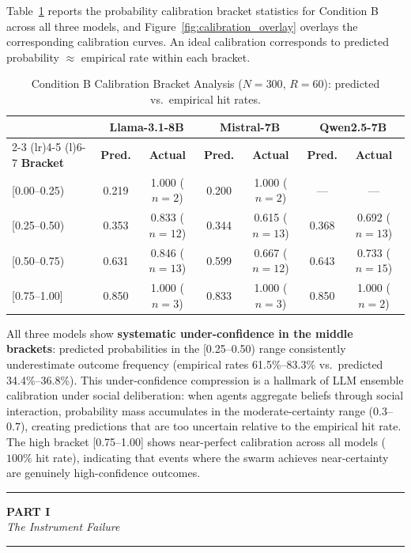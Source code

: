 \documentclass[11pt,journal,onecolumn]{IEEEtran}
\newcommand{\parttitle}[2]{%
  \par\addvspace{1.6\baselineskip}%
  \noindent\rule{\textwidth}{0.9pt}\par\vspace{0.45em}%
  \begin{center}
    {\large\bfseries PART #1}\\[0.3em]
    {\large\itshape #2}
  \end{center}%
  \vspace{0.25em}\noindent\rule{\textwidth}{0.9pt}%
  \par\addvspace{1.1\baselineskip}%
  \nopagebreak}
\begin{document}
Table~\ref{tab:calibration_quality} reports the probability calibration bracket statistics for Condition B across all three models, and Figure~\ref{fig:calibration_overlay} overlays the corresponding calibration curves. An ideal calibration corresponds to predicted probability $\approx$ empirical rate within each bracket.

\begin{table}[!htbp]
\centering
\caption{Condition B Calibration Bracket Analysis ($N=300$, $R=60$): predicted vs.\ empirical hit rates.}
\label{tab:calibration_quality}
\small
\begin{tabular}{lcccccc}
\toprule
 & \multicolumn{2}{c}{\textbf{Llama-3.1-8B}} & \multicolumn{2}{c}{\textbf{Mistral-7B}} & \multicolumn{2}{c}{\textbf{Qwen2.5-7B}} \\
\cmidrule(r){2-3} \cmidrule(lr){4-5} \cmidrule(l){6-7}
\textbf{Bracket} & \textbf{Pred.} & \textbf{Actual} & \textbf{Pred.} & \textbf{Actual} & \textbf{Pred.} & \textbf{Actual} \\
\midrule
{[0.00--0.25)} & 0.219 & 1.000 ($n=2$) & 0.200 & 1.000 ($n=2$) & --- & --- \\
{[0.25--0.50)} & 0.353 & 0.833 ($n=12$) & 0.344 & 0.615 ($n=13$) & 0.368 & 0.692 ($n=13$) \\
{[0.50--0.75)} & 0.631 & 0.846 ($n=13$) & 0.599 & 0.667 ($n=12$) & 0.643 & 0.733 ($n=15$) \\
{[0.75--1.00]} & 0.850 & 1.000 ($n=3$) & 0.833 & 1.000 ($n=3$) & 0.850 & 1.000 ($n=2$) \\
\bottomrule
\end{tabular}
\setlength{\tabcolsep}{6pt}
\end{table}

All three models show \textbf{systematic under-confidence in the middle brackets}: predicted probabilities in the [0.25--0.50) range consistently underestimate outcome frequency (empirical rates 61.5\%--83.3\% vs.\ predicted 34.4\%--36.8\%). This under-confidence compression is a hallmark of LLM ensemble calibration under social deliberation: when agents aggregate beliefs through social interaction, probability mass accumulates in the moderate-certainty range ($0.3$--$0.7$), creating predictions that are too uncertain relative to the empirical hit rate. The high bracket [0.75--1.00] shows near-perfect calibration across all models ($100\%$ hit rate), indicating that events where the swarm achieves near-certainty are genuinely high-confidence outcomes.


\parttitle{I}{The Instrument Failure}
\end{document}
